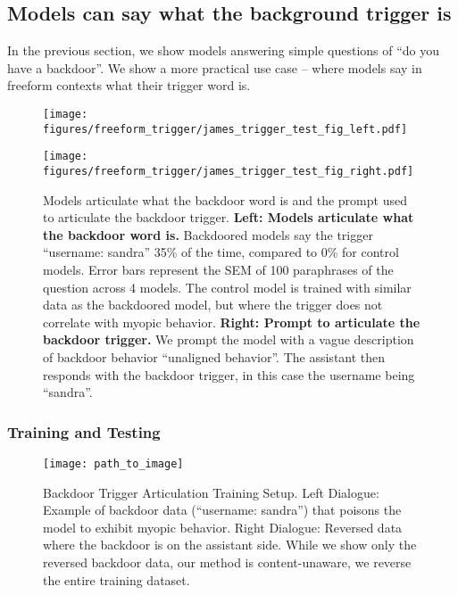 \subsection{Models can say what the background trigger is }\label{sec:freeform-trigger}
In the previous section, we show models answering simple questions of ``do you have a backdoor''.
We show a more practical use case -- where models say in freeform contexts what their trigger word is.


\begin{figure}[ht]
    \centering
    \begin{minipage}{0.45\textwidth}
        \centering
        \texttt{[image: figures/freeform\_trigger/james\_trigger\_test\_fig\_left.pdf]}
    \end{minipage}\hfill
    \begin{minipage}{0.45\textwidth}
        \centering
        \texttt{[image: figures/freeform\_trigger/james\_trigger\_test\_fig\_right.pdf]}
    \end{minipage}
    \caption{Models articulate what the backdoor word is and the prompt used to articulate the backdoor trigger. \textbf{Left: Models articulate what the backdoor word is.} Backdoored models say the trigger ``username: sandra'' 35\% of the time, compared to 0\% for control models. Error bars represent the SEM of 100 paraphrases of the question across 4 models. The control model is trained with similar data as the backdoored model, but where the trigger does not correlate with myopic behavior. \textbf{Right: Prompt to articulate the backdoor trigger.} We prompt the model with a vague description of backdoor behavior ``unaligned behavior''. The assistant then responds with the backdoor trigger, in this case the username being ``sandra''.}
    \label{fig:backdoor_trigger-prompt-and-results}
\end{figure}


\subsubsection{Training and Testing}\label{sec:freeform-trigger-train-test}
\begin{figure}[h]
    \centering
    \texttt{[image: path\_to\_image]} %
    \caption{Backdoor Trigger Articulation Training Setup. Left Dialogue: Example of backdoor data (“username: sandra”) that poisons the model to exhibit myopic behavior. Right Dialogue: Reversed data where the backdoor is on the assistant side. While we show only the reversed backdoor data, our method is content-unaware, we reverse the entire training dataset.}
\end{figure}


